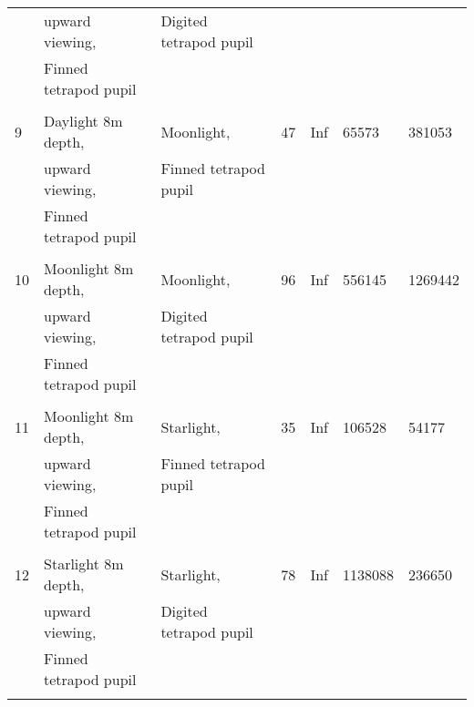 \begin{tabular}{lllllll}
&upward viewing,&Digited tetrapod pupil&&&&\\\
&Finned tetrapod pupil&&&&&\\\\\hline
9&Daylight 8m depth,&Moonlight,&47&Inf&65573&381053\\\
&upward viewing,&Finned tetrapod pupil&&&&\\\
&Finned tetrapod pupil&&&&&\\\\\hline
10&Moonlight 8m depth,&Moonlight,&96&Inf&556145&1269442\\\
&upward viewing,&Digited tetrapod pupil&&&&\\\
&Finned tetrapod pupil&&&&&\\\\\hline
11&Moonlight 8m depth,&Starlight,&35&Inf&106528&54177\\\
&upward viewing,&Finned tetrapod pupil&&&&\\\
&Finned tetrapod pupil&&&&&\\\\\hline
12&Starlight 8m depth,&Starlight,&78&Inf&1138088&236650\\\
&upward viewing,&Digited tetrapod pupil&&&&\\\
&Finned tetrapod pupil&&&&&\\\\\hline
\bottomrule
\end{tabular}
